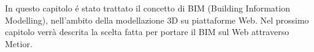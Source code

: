 In questo capitolo \'e stato trattato il concetto di BIM (Building Information Modelling),
nell'ambito della modellazione 3D su piattaforme Web. Nel prossimo
capitolo verrà descrita la scelta fatta per portare il BIM sul Web attraverso Metior.
